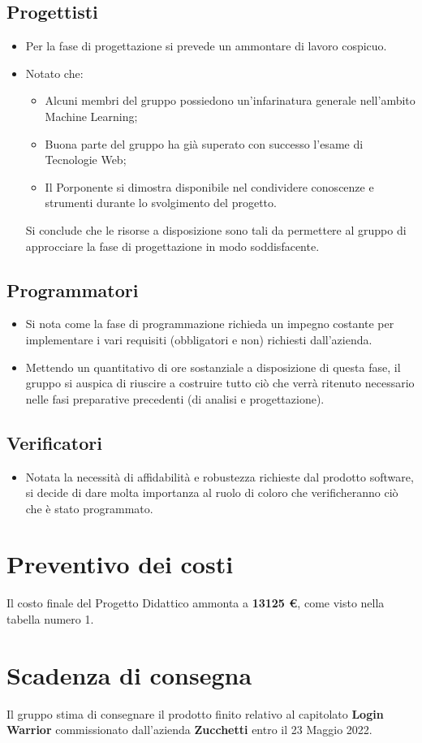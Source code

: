 \documentclass[11pt]{article}
\begin{document}
\subsection{Progettisti}
    \begin{itemize}
        \item Per la fase di progettazione si prevede un ammontare di lavoro cospicuo.
        \item Notato che:
            \begin{itemize}
                \item Alcuni membri del gruppo possiedono un'infarinatura generale nell'ambito Machine Learning;
                \item Buona parte del gruppo ha già superato con successo l'esame di Tecnologie Web;
                \item Il Porponente si dimostra disponibile nel condividere conoscenze e strumenti durante lo svolgimento del progetto.
            \end{itemize}
        Si conclude che le risorse a disposizione sono tali da permettere al gruppo di approcciare la fase di progettazione in modo soddisfacente.
    \end{itemize}
\subsection{Programmatori}
    \begin{itemize}
        \item Si nota come la fase di programmazione richieda un impegno costante per implementare i vari requisiti (obbligatori e non) richiesti dall'azienda.
        \item Mettendo un quantitativo di ore sostanziale a disposizione di questa fase, il gruppo si auspica di riuscire a costruire tutto ciò che verrà ritenuto necessario nelle fasi preparative precedenti (di analisi e progettazione).
    \end{itemize}
\subsection{Verificatori}
    \begin{itemize}
        \item Notata la necessità di affidabilità e robustezza richieste dal prodotto software, si decide di dare molta importanza al ruolo di coloro che verificheranno ciò che è stato programmato.
    \end{itemize}
\section{Preventivo dei costi}
Il costo finale del Progetto Didattico ammonta a \textbf{13125 €}, come visto nella tabella numero 1.
\section{Scadenza di consegna}
Il gruppo stima di consegnare il prodotto finito relativo al capitolato 
\textbf{Login Warrior} commissionato dall'azienda 
\textbf{Zucchetti} entro il 23 Maggio 2022. 
\end{document}

